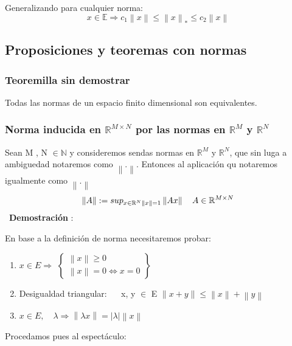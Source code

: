 \documentclass[a4paper , 11pt, spanish ]{article}
\newcommand{\norm}[1]{\left\lVert#1\right\rVert}
\begin{document}
Generalizando para cualquier norma: 
$$ x \in \mathbb{E} \Rightarrow c_1\norm{x} \le \norm{x}_* \le c_2\norm{x} $$

\subsection{ Proposiciones y teoremas con normas}
\subsubsection{ Teoremilla sin demostrar}
Todas las normas de un espacio finito dimensional son equivalentes. 

\subsubsection{ Norma inducida en $\mathbb{R}^{ M\times N }$  por las normas en $\mathbb{R}^{ M}$ y  $\mathbb{R}^{ N }$}  
Sean M , N $\in \mathbb{N}$ y consideremos sendas normas en $\mathbb{R}^{ M}$ y $\mathbb{R}^{ N }$, que sin luga a ambiguedad notaremos como $\norm{.}$. Entonces al aplicación qu notaremos igualmente como $\norm{.}$ 
\[ \norm{A} := sup_{ x \in \mathbb{R}^N \\ \norm{x}= 1 } \norm{Ax} \quad A \in \mathbb{R}^{ M\times N } \]
\
\textbf{Demostración }:
\par 
En base a la definición de norma necesitaremos probar: \\
\begin{enumerate}
\item $ x \in E  \Rightarrow $ $\begin{Bmatrix}
	\norm{x} \ge 0\\
	\norm{x} = 0 \Leftrightarrow x = 0
\end{Bmatrix}$

\item  Desigualdad triangular: $\quad$ x, y $\in $ E $\norm{ x + y } \le \norm{x} + \norm{y}$

\item  $ x \in E, \quad \lambda \Rightarrow \norm{ \lambda x} = |\lambda | \norm{x}$
\end{enumerate}

Procedamos pues al espectáculo:
\end{document}
